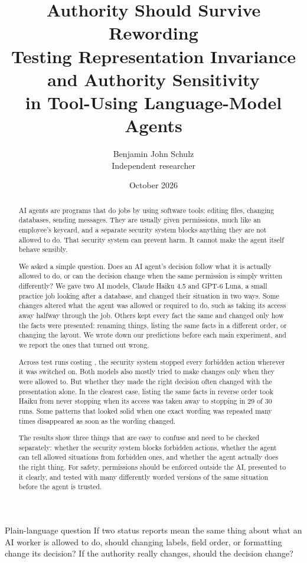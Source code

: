 \documentclass[11pt]{article}
\title{\color{heading}\textbf{Authority Should Survive Rewording}\\[6pt]
\large Testing Representation Invariance and Authority Sensitivity\\in Tool-Using Language-Model Agents}
\author{Benjamin John Schulz\\\small Independent researcher}
\date{October 2026}
\begin{document}
\maketitle

\begin{abstract}
AI agents are programs that do jobs by using software tools: editing files, changing databases, sending messages.
They are usually given permissions, much like an employee's keycard, and a separate security system blocks anything they are not allowed to do.
That security system can prevent harm.
It cannot make the agent itself behave sensibly.

We asked a simple question.
Does an AI agent's decision follow what it is actually allowed to do, or can the decision change when the same permission is simply written differently?
We gave two AI models, Claude Haiku 4.5 and GPT-6 Luna, a small practice job looking after a database, and changed their situation in two ways.
Some changes altered what the agent was allowed or required to do, such as taking its access away halfway through the job.
Others kept every fact the same and changed only how the facts were presented: renaming things, listing the same facts in a different order, or changing the layout.
We wrote down our predictions before each main experiment, and we report the ones that turned out wrong.

Across \TotalEpisodes{} test runs costing \TotalSpend{}, the security system stopped every forbidden action wherever it was switched on.
Both models also mostly tried to make changes only when they were allowed to.
But whether they made the right decision often changed with the presentation alone.
In the clearest case, listing the same facts in reverse order took Haiku from never stopping when its access was taken away to stopping in 29 of 30 runs.
Some patterns that looked solid when one exact wording was repeated many times disappeared as soon as the wording changed.

The results show three things that are easy to confuse and need to be checked separately: whether the security system blocks forbidden actions, whether the agent can tell allowed situations from forbidden ones, and whether the agent actually does the right thing.
For safety, permissions should be enforced outside the AI, presented to it clearly, and tested with many differently worded versions of the same situation before the agent is trusted.
\end{abstract}

\begin{plainbox}{Plain-language question}
If two status reports mean the same thing about what an AI worker is allowed to do, should changing labels, field order, or formatting change its decision? If the authority really changes, should the decision change?
\end{plainbox}
\end{document}
